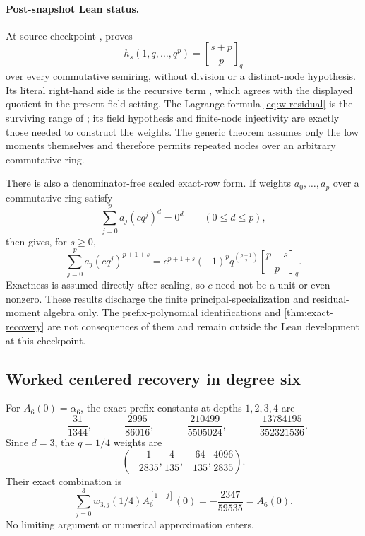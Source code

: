 \documentclass[11pt,oneside]{article}
\theoremstyle{frontier}
\theoremstyle{definition}
\theoremstyle{remark}
\newcommand{\qbinom}[3]{\genfrac{[}{]}{0pt}{}{#1}{#2}_{#3}}
\begin{document}
\paragraph{Post-snapshot Lean status.}
At source checkpoint ,
 proves
\[
 h_s(1,q,\ldots,q^p)=\qbinom{s+p}{p}{q}
\]
over every commutative semiring, without division or a distinct-node
hypothesis.  Its literal right-hand side is the recursive term
, which agrees with the displayed quotient
in the present field setting.  The Lagrange formula \eqref{eq:w-residual} is
the surviving range of ; its
field hypothesis and finite-node injectivity are exactly those needed to
construct the weights.  The generic theorem
 assumes only the low moments
themselves and therefore permits repeated nodes over an arbitrary commutative
ring.

There is also a denominator-free scaled exact-row form.  If weights
\(a_0,\ldots,a_p\) over a commutative ring satisfy
\[
 \sum_{j=0}^{p}a_j(cq^j)^d=0^d\qquad(0\le d\le p),
\]
then  gives, for \(s\ge0\),
\[
 \sum_{j=0}^{p}a_j(cq^j)^{p+1+s}
 =c^{p+1+s}(-1)^p q^{\binom{p+1}{2}}\qbinom{p+s}{p}{q}.
\]
Exactness is assumed directly after scaling, so \(c\) need not be a unit or
even nonzero.  These results discharge the finite principal-specialization and
residual-moment algebra only.  The prefix-polynomial identifications and
\cref{thm:exact-recovery} are not consequences
of them and remain outside the Lean development at this checkpoint.

\subsection{Worked centered recovery in degree six}

For $A_6(0)=\alpha_6$, the exact prefix constants at depths $1,2,3,4$ are
\begin{equation}
 -\frac{31}{1344},
 \qquad
 -\frac{2995}{86016},
 \qquad
 -\frac{210499}{5505024},
 \qquad
 -\frac{13784195}{352321536}.
 \label{eq:A6-prefix-values}
\end{equation}
Since $d=3$, the $q=1/4$ weights are
\begin{equation}
 \left(
 -\frac1{2835},\frac4{135},-\frac{64}{135},\frac{4096}{2835}
 \right).
 \label{eq:q14-weights3}
\end{equation}
Their exact combination is
\begin{equation}
 \sum_{j=0}^{3}w_{3,j}(1/4)A_6^{[1+j]}(0)
 =-\frac{2347}{59535}=A_6(0).
 \label{eq:A6-exact-example}
\end{equation}
No limiting argument or numerical approximation enters.
\end{document}
